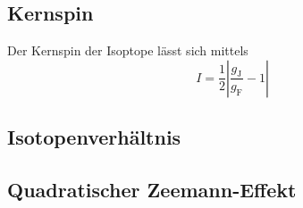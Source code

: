 	\subsection{Kernspin}
		
		\noindent
		Der Kernspin der Isoptope lässt sich mittels 
		\begin{equation}
			I =\frac{1}{2} \left| \frac{g_\text{J}}{g_\text{F}} -1 \right|
		\end{equation}

	\subsection{Isotopenverhältnis}

	\subsection{Quadratischer Zeemann-Effekt}
